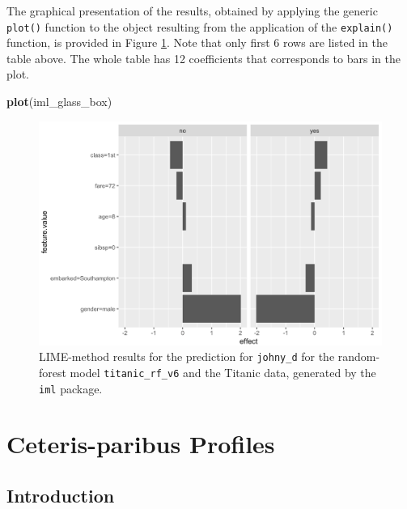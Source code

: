 \documentclass[]{krantz}
\newenvironment{Shaded}{\begin{snugshade}}{\end{snugshade}}
\newcommand{\KeywordTok}[1]{\textcolor[rgb]{0.13,0.29,0.53}{\textbf{#1}}}
\newcommand{\NormalTok}[1]{#1}
\begin{document}
The graphical presentation of the results, obtained by applying the generic \texttt{plot()} function to the object resulting from the application of the \texttt{explain()} function, is provided in Figure \ref{fig:limeExplIMLTitanic}. Note that only first 6 rows are listed in the table above. The whole table has 12 coefficients that corresponds to bars in the plot.

\begin{Shaded}
\begin{Highlighting}[]
\KeywordTok{plot}\NormalTok{(iml_glass_box) }
\end{Highlighting}
\end{Shaded}



\begin{figure}

{\centering \includegraphics[width=0.6\linewidth]{figure/lime_expl_iml_titanic} 

}

\caption{LIME-method results for the prediction for \texttt{johny\_d} for the random-forest model \texttt{titanic\_rf\_v6} and the Titanic data, generated by the \texttt{iml} package.}\label{fig:limeExplIMLTitanic}
\end{figure}

\hypertarget{ceterisParibus}{%
\chapter{Ceteris-paribus Profiles}\label{ceterisParibus}}

\hypertarget{CPIntro}{%
\section{Introduction}\label{CPIntro}}
\end{document}
